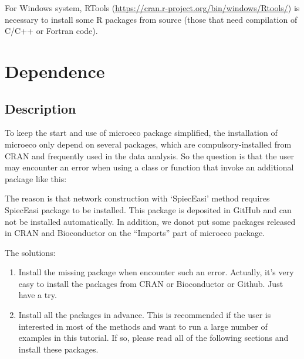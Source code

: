 \documentclass[
]{book}
\newenvironment{Shaded}{\begin{snugshade}}{\end{snugshade}}
\newcommand{\AttributeTok}[1]{\textcolor[rgb]{0.13,0.29,0.53}{#1}}
\newcommand{\FloatTok}[1]{\textcolor[rgb]{0.00,0.00,0.81}{#1}}
\newcommand{\FunctionTok}[1]{\textcolor[rgb]{0.13,0.29,0.53}{\textbf{#1}}}
\newcommand{\NormalTok}[1]{#1}
\newcommand{\OtherTok}[1]{\textcolor[rgb]{0.56,0.35,0.01}{#1}}
\newcommand{\SpecialCharTok}[1]{\textcolor[rgb]{0.81,0.36,0.00}{\textbf{#1}}}
\newcommand{\StringTok}[1]{\textcolor[rgb]{0.31,0.60,0.02}{#1}}
\begin{document}
For Windows system,
RTools (\url{https://cran.r-project.org/bin/windows/Rtools/}) is necessary to install some R packages from source (those that need compilation of C/C++ or Fortran code).

\section{Dependence}\label{dependence}

\subsection{Description}\label{description}

To keep the start and use of microeco package simplified,
the installation of microeco only depend on several packages, which are compulsory-installed from CRAN and frequently used in the data analysis.
So the question is that the user may encounter an error when using a class or function that invoke an additional package like this:

\begin{Shaded}
\end{Shaded}

\begin{Shaded}
\end{Shaded}

The reason is that network construction with `SpiecEasi' method requires SpiecEasi package to be installed.
This package is deposited in GitHub and can not be installed automatically.
In addition, we donot put some packages released in CRAN and Bioconductor on the ``Imports'' part of microeco package.

The solutions:

\begin{enumerate}
\def\labelenumi{\arabic{enumi}.}
\item
  Install the missing package when encounter such an error. Actually, it's very easy to install the packages from CRAN or Bioconductor or Github. Just have a try.
\item
  Install all the packages in advance.
  This is recommended if the user is interested in most of the methods and want to run a large number of examples in this tutorial.
  If so, please read all of the following sections and install these packages.
\end{enumerate}
\end{document}
